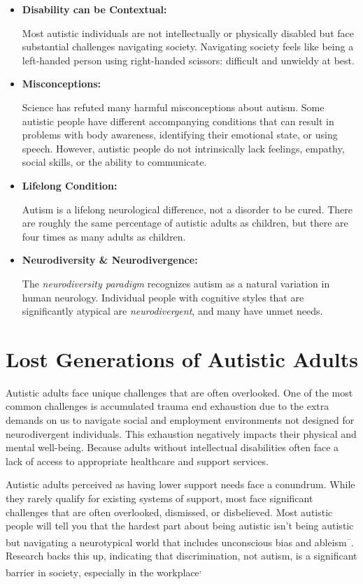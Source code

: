 \documentclass[
  letterpaper,
  DIV=11,
  numbers=noendperiod]{scrreprt}
\begin{document}
\begin{itemize}
\item
  \textbf{Disability can be Contextual:}

  Most autistic individuals are not intellectually or physically
  disabled but face substantial challenges navigating society.
  Navigating society feels like being a left-handed person using
  right-handed scissors: difficult and unwieldy at best.
\item
  \textbf{Misconceptions:}

  Science has refuted many harmful misconceptions about autism. Some
  autistic people have different accompanying conditions that can result
  in problems with body awareness, identifying their emotional state, or
  using speech. However, autistic people do not intrinsically lack
  feelings, empathy, social skills, or the ability to communicate.
\item
  \textbf{Lifelong Condition:}

  Autism is a lifelong neurological difference, not a disorder to be
  cured. There are roughly the same percentage of autistic adults as
  children, but there are four times as many adults as children.
\item
  \textbf{Neurodiversity \& Neurodivergence:}

  The \emph{neurodiversity paradigm} recognizes autism as a natural
  variation in human neurology. Individual people with cognitive styles
  that are significantly atypical are \emph{neurodivergent}, and many
  have unmet needs.
\end{itemize}

\section{Lost Generations of Autistic
Adults}\label{sec-autism2024_lost_gen}

Autistic adults face unique challenges that are often overlooked. One of
the most common challenges is accumulated trauma end exhaustion due to
the extra demands on us to navigate social and employment environments
not designed for neurodivergent individuals. This exhaustion negatively
impacts their physical and mental well-being. Because adults without
intellectual disabilities often face a lack of access to appropriate
healthcare and support services.

Autistic adults perceived as having lower support needs face a
conundrum. While they rarely qualify for existing systems of support,
most face significant challenges that are often overlooked, dismissed,
or disbelieved. Most autistic people will tell you that the hardest part
about being autistic isn't being autistic but navigating a neurotypical
world that includes unconscious bias and
ableism\textsuperscript{--}.
Research backs this up, indicating that discrimination, not autism, is a
significant barrier in
society\textsuperscript{}, especially in the
workplace\textsuperscript{,}
\end{document}
